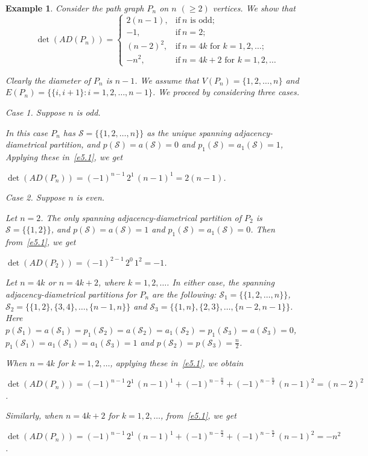 \documentclass[12pt]{article}
\numberwithin{equation}{section}
\newtheorem{example}{Example}[section]
\begin{document}
	
	\begin{example}\normalfont
		Consider the path graph $P_n$ on $n$ $(\geq 2)$ vertices. We show that
		\[
		\det(AD(P_n))=
		\begin{cases}
			2(n-1), & \text{if}~ n \text{ is odd};\\
			-1, & \text{if}~ n=2;\\
			(n-2)^2, & \text{if}~n=4k \text{ for } k=1,2,\dots;\\
			-n^2, & \text{if}~n=4k+2 \text{ for } k=1,2,\dots \end{cases} 
		\]		
		
		Clearly the diameter of $P_n$ is $n-1$. We assume that $V(P_n)=\{1,2,\ldots, n\}$ and $E(P_n)=\{\{i, i+1\} : i=1,2,\ldots, n-1\}$. We proceed by considering three cases.
		
		\noindent \textit{Case 1.}
		Suppose $n$ is odd.
		
		In this case $P_n$ has $\mathcal S=\{\{1,2,\dots,n\}\}$ as the unique spanning adjacency-diametrical partition, and  $p(\mathcal S)=a(\mathcal S)=0$ and  $p_1(\mathcal S)=a_1(\mathcal S)=1$, Applying these in~\eqref{e5.1}, we get
		\begin{center}
			$\det(AD(P_n))= (-1)^{n-1}\,2^1\,(n-1)^1=2(n-1)$.
		\end{center}
		
		
		\noindent \textit{Case 2.}
		Suppose $n$ is even. 
		
	Let $n=2$. The only spanning adjacency-diametrical partition of $P_2$ is $\mathcal S=\{\{1,2\}\}$, and $p(\mathcal S)=a(\mathcal S)=1$ and $p_1(\mathcal S)=a_1(\mathcal S)=0$. Then from~\eqref{e5.1}, we get
		\begin{center}
			$\det(AD(P_2))= (-1)^{2-1}\,2^0\,1^2=-1$.
		\end{center} 
	
		Let $n=4k$ or $n=4k+2$, where $k=1,2,\dots$. In either case,  the spanning adjacency-diametrical partitions for $P_n$ are the following:		
		$\mathcal S_1=\{\{1,2,\dots,n\}\}$, $\mathcal S_2=\{\{1,2\}, \{3,4\}, \dots, \{n-1, n\}\}$ and $\mathcal S_3=\{\{1,n\}, \{2,3\},\dots,\{n-2,n-1\}\}$. Here $p(\mathcal S_1)=a(\mathcal S_1)=p_1(\mathcal S_2)=a(\mathcal S_2)=a_1(\mathcal S_2)=p_1(\mathcal S_3)=a(\mathcal S_3)=0$, $p_1(\mathcal S_1)=a_1(\mathcal S_1)=a_1(\mathcal S_3)=1$ and $p(\mathcal S_2)=p(\mathcal S_3)=\frac{n}{2}$.
				
		When $n=4k$ for $k=1,2,\dots$, applying these in~\eqref{e5.1}, we obtain
		\begin{center}
			$\det(AD(P_n))= (-1)^{n-1}\,2^1\,(n-1)^1 + (-1)^{n-\frac{n}{2}}+(-1)^{n-\frac{n}{2}}\,(n-1)^2 =(n-2)^2$.
		\end{center}        
	
		Similarly, when $n=4k+2$ for $k=1,2,\dots$, from~\eqref{e5.1}, we get
	     \begin{center}
	     	$\det(AD(P_n))= (-1)^{n-1}\,2^1\,(n-1)^1 + (-1)^{n-\frac{n}{2}}+(-1)^{n-\frac{n}{2}}\,(n-1)^2 =-n^2$.
	     \end{center}                   
	\end{example}
	
\end{document}
